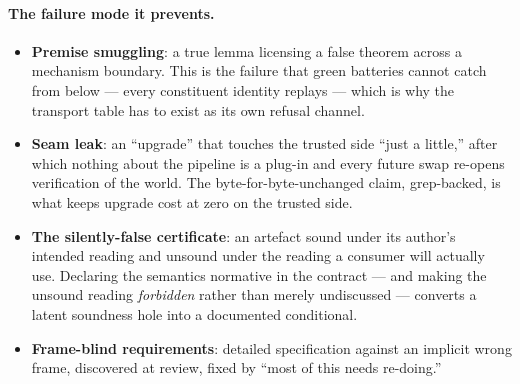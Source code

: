 \paragraph{The failure mode it prevents.}
\begin{itemize}
\item \textbf{Premise smuggling}: a true lemma licensing a false
  theorem across a mechanism boundary. This is the failure that green
  batteries cannot catch from below --- every constituent identity
  replays --- which is why the transport table has to exist as its own
  refusal channel.
\item \textbf{Seam leak}: an ``upgrade'' that touches the trusted side
  ``just a little,'' after which nothing about the pipeline is a
  plug-in and every future swap re-opens verification of the world.
  The byte-for-byte-unchanged claim, grep-backed, is what keeps
  upgrade cost at zero on the trusted side.
\item \textbf{The silently-false certificate}: an artefact sound under
  its author's intended reading and unsound under the reading a
  consumer will actually use. Declaring the semantics normative in the
  contract --- and making the unsound reading \emph{forbidden} rather
  than merely undiscussed --- converts a latent soundness hole into a
  documented conditional.
\item \textbf{Frame-blind requirements}: detailed specification
  against an implicit wrong frame, discovered at review, fixed by
  ``most of this needs re-doing.''
\end{itemize}


